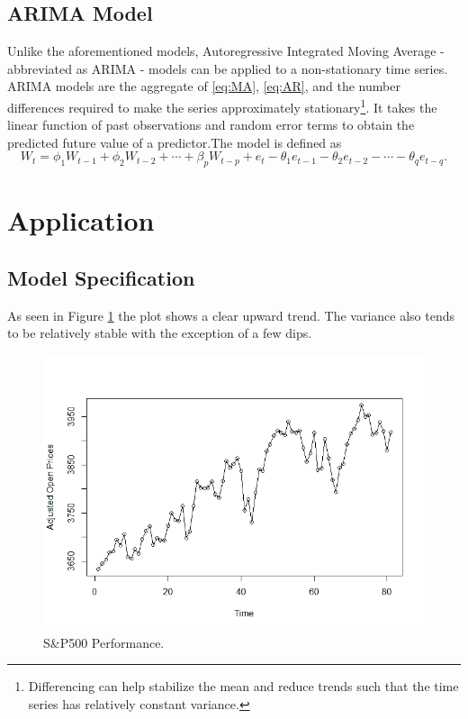 \documentclass[12pt, centerh1]{article}
\begin{document}
\subsection{ARIMA Model}

Unlike the aforementioned models, Autoregressive Integrated Moving Average - abbreviated as ARIMA - models can be applied to a non-stationary time series. ARIMA models are the aggregate of \eqref{eq:MA}, \eqref{eq:AR}, and the number differences required to make the series approximately stationary\footnote{Differencing can help stabilize the mean and reduce trends such that the time series has relatively constant variance.}. It takes the linear function of past observations and random error terms to obtain the predicted future value of a predictor.The model is defined as
\begin{equation}\label{eq:ARIMA}
        W_t = \phi_1W_{t-1} + \phi_2W_{t-2} + \cdots + \beta_pW_{t-p} + e_t - \theta_1e_{t-1} - \theta_2e_{t-2} - \cdots - \theta_qe_{t-q}. 
\end{equation}

\section{Application} \label{application}

\subsection{Model Specification}

As seen in Figure \ref{fig:USA_open} the plot shows a clear upward trend. The variance also tends to be relatively stable with the exception of a few dips.

\begin{figure}[H]
    \centering
    \includegraphics[scale=0.5]{imgs/USA_open.png}
    \caption{S\&P500 Performance.}
    \label{fig:USA_open}
\end{figure}
\end{document}
